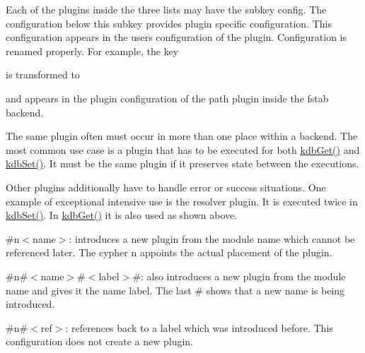 Each of the plugins inside the three lists may have the subkey {\ttfamily config}. The configuration below this subkey provides plugin specific configuration. This configuration appears in the user\textquotesingle{}s configuration of the plugin. Configuration is renamed properly. For example, the key


\begin{DoxyCode}{0}
\end{DoxyCode}


is transformed to


\begin{DoxyCode}{0}
\end{DoxyCode}


and appears in the plugin configuration of the path plugin inside the fstab backend.

The same plugin often must occur in more than one place within a backend. The most common use case is a plugin that has to be executed for both {\ttfamily \mbox{\hyperlink{group__kdb_ga28e385fd9cb7ccfe0b2f1ed2f62453a1}{kdb\+Get()}}} and {\ttfamily \mbox{\hyperlink{group__kdb_ga11436b058408f83d303ca5e996832bcf}{kdb\+Set()}}}. It must be the same plugin if it preserves state between the executions.

Other plugins additionally have to handle error or success situations. One example of exceptional intensive use is the resolver plugin. It is executed twice in {\ttfamily \mbox{\hyperlink{group__kdb_ga11436b058408f83d303ca5e996832bcf}{kdb\+Set()}}}. In {\ttfamily \mbox{\hyperlink{group__kdb_ga28e385fd9cb7ccfe0b2f1ed2f62453a1}{kdb\+Get()}}} it is also used as shown above.


\begin{DoxyItemize}
\item {\ttfamily \#n$<$name$>$}\+: introduces a new plugin from the module {\ttfamily name} which cannot be referenced later. The cypher {\ttfamily n} appoints the actual placement of the plugin.
\item {\ttfamily \#n\#$<$name$>$\#$<$label$>$\#}\+: also introduces a new plugin from the module {\ttfamily name} and gives it the name {\ttfamily label}. The last {\ttfamily \#} shows that a new name is being introduced.
\item {\ttfamily \#n\#$<$ref$>$}\+: references back to a label which was introduced before. This configuration does not create a new plugin.
\end{DoxyItemize}

